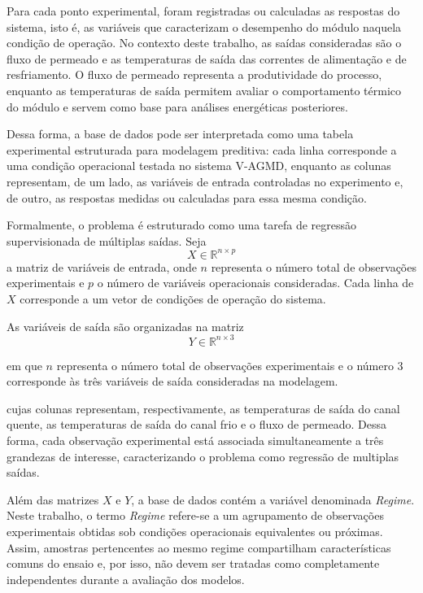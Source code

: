 Para cada ponto experimental, foram registradas ou calculadas as respostas do sistema, isto é, as variáveis que caracterizam o desempenho do módulo naquela condição de operação. No contexto deste trabalho, as saídas consideradas são o fluxo de permeado e as temperaturas de saída das correntes de alimentação e de resfriamento. O fluxo de permeado representa a produtividade do processo, enquanto as temperaturas de saída permitem avaliar o comportamento térmico do módulo e servem como base para análises energéticas posteriores.

Dessa forma, a base de dados pode ser interpretada como uma tabela experimental estruturada para modelagem preditiva: cada linha corresponde a uma condição operacional testada no sistema V-AGMD, enquanto as colunas representam, de um lado, as variáveis de entrada controladas no experimento e, de outro, as respostas medidas ou calculadas para essa mesma condição.

Formalmente, o problema é estruturado como uma tarefa de regressão supervisionada de múltiplas saídas. Seja
\[
X \in \mathbb{R}^{n \times p}
\]
a matriz de variáveis de entrada, onde \( n \) representa o número total de observações experimentais e \( p \) o número de variáveis operacionais consideradas. Cada linha de \( X \) corresponde a um vetor de condições de operação do sistema.

As variáveis de saída são organizadas na matriz
\begin{equation}
Y \in \mathbb{R}^{n \times 3}    
\end{equation}

\noindent em que \(n\) representa o número total de observações experimentais e o número \(3\) corresponde às três variáveis de saída consideradas na modelagem.

cujas colunas representam, respectivamente, as temperaturas de saída do canal quente, as temperaturas de saída do canal frio e o fluxo de permeado. Dessa forma, cada observação experimental está associada simultaneamente a três grandezas de interesse, caracterizando o problema como regressão de multiplas saídas.

Além das matrizes \(X\) e \(Y\), a base de dados contém a variável denominada \textit{Regime}. Neste trabalho, o termo \textit{Regime} refere-se a um agrupamento de observações experimentais obtidas sob condições operacionais equivalentes ou próximas. Assim, amostras pertencentes ao mesmo regime compartilham características comuns do ensaio e, por isso, não devem ser tratadas como completamente independentes durante a avaliação dos modelos.

